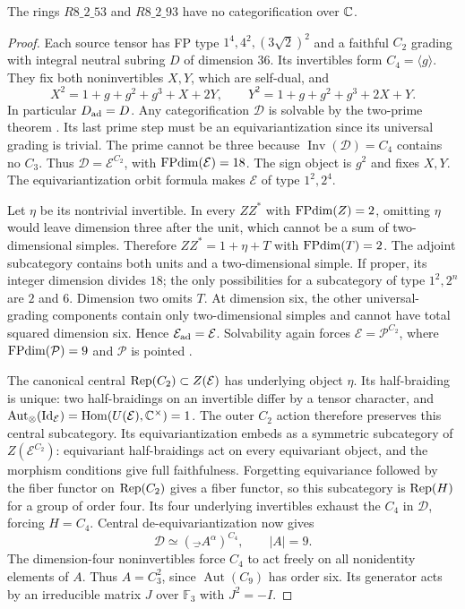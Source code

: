 \begin{proposition}\label{prop:dimension72}
The rings $R8\_2\_53$ and $R8\_2\_93$ have no categorification over $\mathbb C$.
\end{proposition}
\nopagebreak[4]
\begin{proof}
Each source tensor has FP type $1^4,4^2,(3\sqrt2)^2$ and a faithful
$C_2$ grading with integral neutral subring $D$ of dimension $36$.
Its invertibles form $C_4=\langle g\rangle$. They fix both
noninvertibles $X,Y$, which are self-dual, and
\[
X^2=1+g+g^2+g^3+X+2Y,\qquad
Y^2=1+g+g^2+g^3+2X+Y.
\]
In particular $D_{\rm ad}=D$. Any categorification $\mathcal D$ is
solvable by the two-prime theorem \cite[Theorem~1.6]{ENOSolvable}.
Its last prime step must be an equivariantization since its universal
grading is trivial. The prime cannot be three because
$\operatorname{Inv}(\mathcal D)=C_4$ contains no $C_3$. Thus
$\mathcal D=\mathcal E^{C_2}$, with $\operatorname{FPdim}(\mathcal E)=18$.
The sign object is $g^2$ and fixes $X,Y$. The equivariantization
orbit formula \cite{BurciuNatale} makes $\mathcal E$ of type $1^2,2^4$.

Let $\eta$ be its nontrivial invertible. In every $ZZ^*$ with
$\operatorname{FPdim}(Z)=2$, omitting $\eta$ would leave dimension three after the
unit, which cannot be a sum of two-dimensional simples. Therefore
$ZZ^*=1+\eta+T$ with $\operatorname{FPdim}(T)=2$. The adjoint subcategory contains
both units and a two-dimensional simple. If proper, its integer
dimension divides $18$; the only possibilities for a subcategory of
type $1^2,2^n$ are $2$ and $6$. Dimension two omits $T$. At dimension
six, the other universal-grading components contain only
two-dimensional simples and cannot have total squared dimension six.
Hence $\mathcal E_{\rm ad}=\mathcal E$.
Solvability again forces $\mathcal E=\mathcal P^{C_2}$, where
$\operatorname{FPdim}(\mathcal P)=9$ and $\mathcal P$ is pointed \cite{ENO,EGNO}.

The canonical central $\operatorname{Rep}(C_2)\subset Z(\mathcal E)$ has underlying
object $\eta$. Its half-braiding is unique: two half-braidings on an
invertible differ by a tensor character, and
$\operatorname{Aut}_\otimes(\operatorname{Id}_{\mathcal E})
=\operatorname{Hom}(U(\mathcal E),\mathbb C^\times)=1$.
The outer $C_2$ action therefore preserves this central subcategory.
Its equivariantization embeds as a symmetric subcategory of
$Z(\mathcal E^{C_2})$: equivariant half-braidings act on every
equivariant object, and the morphism conditions give full faithfulness.
Forgetting equivariance followed by the fiber functor on $\operatorname{Rep}(C_2)$
gives a fiber functor, so this subcategory is $\operatorname{Rep}(H)$ for a group
of order four. Its four underlying invertibles exhaust the $C_4$
in $\mathcal D$, forcing $H=C_4$.
Central de-equivariantization \cite{DGNO,EGNO} now gives
\[
\mathcal D\simeq(\Vec_A^\alpha)^{C_4},\qquad |A|=9.
\]
The dimension-four noninvertibles force $C_4$ to act freely on all
nonidentity elements of $A$. Thus $A=C_3^2$, since
$\operatorname{Aut}(C_9)$ has order six. Its generator acts by an
irreducible matrix $J$ over $\mathbb F_3$ with $J^2=-I$.


\end{proof}
